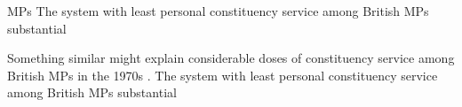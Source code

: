 


MPs The system with least personal  constituency service among British MPs substantial 

Something similar might explain considerable doses of constituency service among British MPs in the 1970s \citep{cain.etal.1987}. The system with least personal  constituency service among British MPs substantial 
